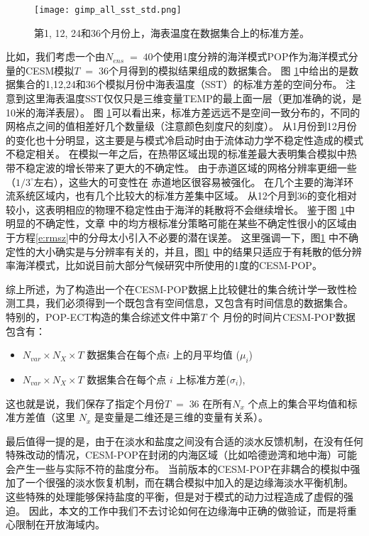 \begin {figure} 
\centering
\texttt{[image: gimp\_all\_sst\_std.png]}
\caption{第1, 12, 24和36个月份上，海表温度在数据集合上的标准方差。}
\label{fig:SST_STD_all}
\end {figure}

比如，我们考虑一个由$N_{ens} \;=\; 40$个使用1度分辨的海洋模式POP作为海洋模式分量的CESM模拟$T\;=\;36$个月得到的模拟结果组成的数据集合。 
图 \ref{fig:SST_STD_all}中给出的是数据集合的1,12,24和36个模拟月份中海表温度（SST）的标准方差的空间分布。
注意到这里海表温度SST仅仅只是三维变量TEMP的最上面一层（更加准确的说，是10米的海洋表层）。
图 \ref{fig:SST_STD_all}可以看出来，标准方差远远不是空间一致分布的，不同的网格点之间的值相差好几个数量级（注意颜色刻度尺的刻度）。 
从1月份到12月份的变化也十分明显，这主要是与模式冷启动时由于流体动力学不稳定性造成的模式不稳定相关。  
在模拟一年之后，在热带区域出现的标准差最大表明集合模拟中热带不稳定波的增长带来了更大的不确定性\cite{legeckis1977}。
由于赤道区域的网格分辨率更细一些（$1/3^\circ$左右），这些大的可变性在 赤道地区很容易被强化。 
在几个主要的海洋环流系统区域内，也有几个比较大的标准方差集中区域。
从12个月到36的变化相对较小，这表明相应的物理不稳定性由于海洋的耗散将不会继续增长。
鉴于图 \ref{fig:SST_STD_all}中明显的不确定性，文章\cite{yong2015} 中的均方根标准分策略可能在某些不确定性很小的区域由于方程\ref{e:rmsz}中的分母太小引入不必要的潜在误差。
这里强调一下，图\ref{fig:SST_STD_all} 中不确定性的大小确实是与分辨率有关的，并且，图\ref{fig:SST_STD_all} 中的结果只适应于有耗散的低分辨率海洋模式，比如说目前大部分气候研究中所使用的1度的CESM-POP。


 
综上所述，为了构造出一个在CESM-POP数据上比较健壮的集合统计学一致性检测工具，我们必须得到一个既包含有空间信息，又包含有时间信息的数据集合。
特别的，POP-ECT构造的集合综述文件中第$T$ 个 月份的时间片CESM-POP数据包含有：
\begin{itemize}
 \item $N_{var} \times N_X \times T$ 数据集合在每个点$i$ 上的月平均值 ($\mu_i$)
 \item $N_{var} \times N_X \times T$ 数据集合在每个点 $i$ 上标准方差($\sigma_i$),
 \end{itemize}
 这也就是说，我们保存了指定个月份$T \;=\; 36$ 在所有$N_x$ 个点上的集合平均值和标准方差值（这里 $N_x$ 是变量是二维还是三维的变量有关系）。
 

 最后值得一提的是，由于在淡水和盐度之间没有合适的淡水反馈机制，在没有任何特殊改动的情况，CESM-POP在封闭的内海区域（比如哈德逊湾和地中海）可能会产生一些与实际不符的盐度分布。
当前版本的CESM-POP在非耦合的模拟中强加了一个很强的淡水恢复机制，而在耦合模拟中加入的是边缘海淡水平衡机制。
这些特殊的处理能够保持盐度的平衡，但是对于模式的动力过程造成了虚假的强迫。
因此，本文的工作中我们不去讨论如何在边缘海中正确的做验证，而是将重心限制在开放海域内。

